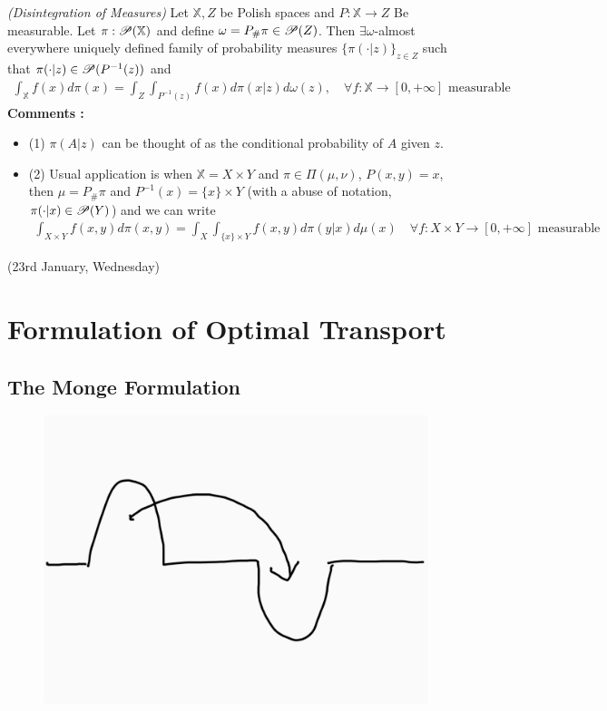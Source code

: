 \documentclass[12pt,a4paper]{article}
\renewenvironment{i}
{\begin{itemize} 
	}%
	{\end{itemize}
}
\begin{document}
 \emph{(Disintegration of Measures)} Let $\mathbb{X}, Z$ be Polish spaces and $P : \mathbb{X}\rightarrow Z$ Be measurable. Let $\pi : \mathscr{P}(\mathbb{X})$ and define $\omega= P_{\#} \pi \in \mathscr{P}(Z)$. Then $\exists \omega$-almost everywhere uniquely defined family of probability measures $\{\pi(\cdot |z)\}_{z\in Z}$ such that $\pi(\cdot |z) \in \mathscr{P}(P^{-1}(z))$ and
\begin{align*}
\int_{\mathbb{X}} f(x) d\pi(x) = \int_Z \int_{P^{-1}(z)} f(x) d\pi(x|z)d\omega(z), \quad \forall f: \mathbb{X}\rightarrow [0, +\infty] \text{ measurable}
\end{align*}
\textbf{Comments :}
\begin{i}
\item[(1)] $\pi(A|z)$ can be thought of as the conditional probability of $A$ given $z$.
\item[(2)] Usual application is when $\mathbb{X} = X\times Y$ and $\pi \in \Pi(\mu, \nu)$, $P(x,y) = x$, then $\mu = P_{\#}\pi$ and $P^{-1}(x) = \{x\} \times Y$ (with a abuse of notation, $\pi(\cdot |x) \in \mathscr{P}(Y)$) and we can write
\begin{align*}
\int_{X\times Y} f(x,y) d\pi(x,y) = \int_X \int_{\{x\}\times Y} f(x,y) d\pi(y|x) d\mu(x) \quad \forall f: X\times Y \rightarrow [0, +\infty] \text{ measurable}
\end{align*}
\end{i}
\s

\newday

(23rd January, Wednesday)

\section{Formulation of Optimal Transport}

\subsection{The Monge Formulation} 

\begin{figure}[h]
\begin{center}
    \includegraphics[scale=0.15]{1}
\end{center}
\end{figure}
\end{document}

